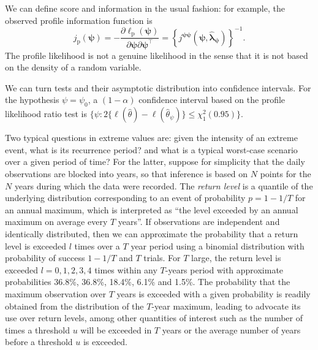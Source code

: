 \documentclass[]{book}
\begin{document}
We can define score and information in the usual fashion: for example, the observed profile information function is
\[j_\mathrm{p}(\boldsymbol{\psi})
=-\frac{\partial \ell_\mathrm{p}(\boldsymbol{\psi})}{\partial \boldsymbol{\psi}\partial \boldsymbol{\psi}^\top} 
= \left\{j^{\boldsymbol{\psi\psi}}(\boldsymbol{\psi}, \hat{\boldsymbol{\lambda}}_{\boldsymbol{\psi}})\right\}^{-1}.
\]
The profile likelihood is not a
genuine likelihood in the sense that it is not based on the density of a random variable.

We can turn tests and their asymptotic distribution into confidence intervals. For the hypothesis \(\psi = \psi_0\), a \((1-\alpha)\) confidence interval based on the profile likelihood ratio test is \(\{ \psi: 2\{\ell(\hat{\theta}) - \ell(\hat{\theta}_{\psi})\} \leq \chi^2_1(0.95)\}\).

Two typical questions in extreme values are: given the intensity of an extreme event, what is its recurrence period? and what is a typical worst-case scenario over a given period of time? For the latter, suppose for simplicity that the daily observations are blocked into years, so that inference is based on \(N\) points for the \(N\) years during which the data were recorded. The \emph{return level} is a quantile of the underlying distribution corresponding to an event of probability \(p=1-1/T\) for an annual maximum, which is interpreted as ``the level exceeded by an annual maximum on average every \(T\) years''. If observations are independent and identically distributed, then we can approximate the probability that a return level is exceeded \(l\) times over a \(T\) year period using a binomial distribution with probability of success \(1-1/T\) and \(T\) trials. For \(T\) large, the return level is exceeded \(l=0, 1, 2, 3, 4\) times within any \(T\)-years period with approximate probabilities 36.8\%, 36.8\%, 18.4\%, 6.1\% and 1.5\%. The probability that the maximum observation over \(T\) years is exceeded with a given probability is readily obtained from the distribution of the \(T\)-year maximum, leading \citep[\S3(b)]{Cox:2002} to advocate its use over return levels, among other quantities of interest such as the number of times a threshold \(u\) will be exceeded in \(T\) years or the average number of years before a threshold \(u\) is exceeded.
\end{document}
